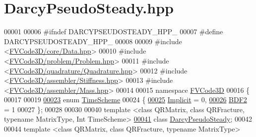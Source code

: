 \hypertarget{DarcyPseudoSteady_8hpp_source}{}\section{Darcy\+Pseudo\+Steady.\+hpp}
\label{DarcyPseudoSteady_8hpp_source}

\begin{DoxyCode}
00001 
00006 \textcolor{preprocessor}{#ifndef DARCYPSEUDOSTEADY\_HPP\_}
00007 \textcolor{preprocessor}{#define DARCYPSEUDOSTEADY\_HPP\_}
00008 
00009 \textcolor{preprocessor}{#include <\hyperlink{Data_8hpp}{FVCode3D/core/Data.hpp}>}
00010 \textcolor{preprocessor}{#include <\hyperlink{Problem_8hpp}{FVCode3D/problem/Problem.hpp}>}
00011 \textcolor{preprocessor}{#include <\hyperlink{Quadrature_8hpp}{FVCode3D/quadrature/Quadrature.hpp}>}
00012 \textcolor{preprocessor}{#include <\hyperlink{Stiffness_8hpp}{FVCode3D/assembler/Stiffness.hpp}>}
00013 \textcolor{preprocessor}{#include <\hyperlink{Mass_8hpp}{FVCode3D/assembler/Mass.hpp}>}
00014 
00015 \textcolor{keyword}{namespace }\hyperlink{namespaceFVCode3D}{FVCode3D}
00016 \{
00017 
00019 
\hypertarget{DarcyPseudoSteady_8hpp_source.tex_l00023}{}\hyperlink{namespaceFVCode3D_ad641b84e1a5460b6a35354f61f27009a}{00023} \textcolor{keyword}{enum} \hyperlink{namespaceFVCode3D_ad641b84e1a5460b6a35354f61f27009a}{TimeScheme}
00024 \{
\hypertarget{DarcyPseudoSteady_8hpp_source.tex_l00025}{}\hyperlink{namespaceFVCode3D_ad641b84e1a5460b6a35354f61f27009aa349f3bb73703f75dbaa1ba38998671d1}{00025}     \hyperlink{namespaceFVCode3D_ad641b84e1a5460b6a35354f61f27009aa349f3bb73703f75dbaa1ba38998671d1}{Implicit} = 0,
\hypertarget{DarcyPseudoSteady_8hpp_source.tex_l00026}{}\hyperlink{namespaceFVCode3D_ad641b84e1a5460b6a35354f61f27009aa3cbb28a9274dccd4cacd41ad5d823bed}{00026}     \hyperlink{namespaceFVCode3D_ad641b84e1a5460b6a35354f61f27009aa3cbb28a9274dccd4cacd41ad5d823bed}{BDF2} = 1
00027 \};
00028 
00030 
00040 \textcolor{keyword}{template} <\textcolor{keyword}{class} QRMatrix, \textcolor{keyword}{class} QRFracture, \textcolor{keyword}{typename} MatrixType, Int TimeScheme>
\hypertarget{DarcyPseudoSteady_8hpp_source.tex_l00041}{}\hyperlink{classFVCode3D_1_1DarcyPseudoSteady}{00041} \textcolor{keyword}{class }\hyperlink{classFVCode3D_1_1DarcyPseudoSteady}{DarcyPseudoSteady};
00042 
00044 \textcolor{keyword}{template} <\textcolor{keyword}{class} QRMatrix, \textcolor{keyword}{class} QRFracture, \textcolor{keyword}{typename} MatrixType>

\end{DoxyCode}
